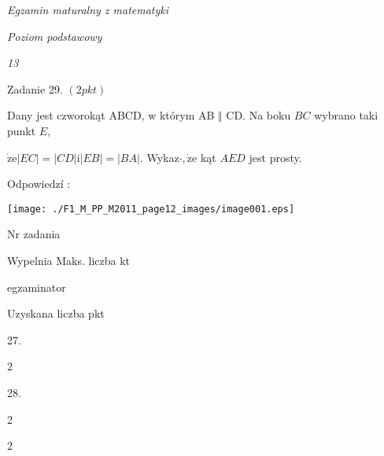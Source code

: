 \documentclass[a4paper,12pt]{article}
\begin{document}
{\it Egzamin maturalny z matematyki}

{\it Poziom podstawowy}

{\it 13}

Zadanie 29. $(2pkt)$

Dany jest czworokąt ABCD, w którym AB $\Vert$ CD. Na boku $BC$ wybrano taki punkt $E,$

$\dot{\mathrm{z}}\mathrm{e}|EC|=|CD|\mathrm{i}|EB|=|BA|$. Wykaz$\cdot, \dot{\mathrm{z}}\mathrm{e}$ kąt $AED$ jest prosty.

Odpowiedzí :
\begin{center}
\texttt{[image: ./F1\_M\_PP\_M2011\_page12\_images/image001.eps]}
\end{center}
Nr zadania

Wypelnia Maks. liczba kt

egzaminator

Uzyskana liczba pkt

27.

2

28.

2

2
\end{document}

